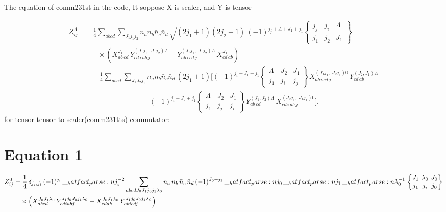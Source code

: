 \documentclass{scrartcl}
\newcommand{\sixj}[6]{\begingroup\setlength{\arraycolsep}{0.2em}\begin{Bmatrix} #1 & #2 & #3 \\ #4 & #5 & #6 \end{Bmatrix}\endgroup}
\begin{document}
The equation of comm231st in the code, It soppose X is scaler, and Y is tensor




\begin{align}
Z_{ij}^{\Lambda}
&= \frac{1}{4}\sum_{abcd}\sum_{J_1 j_1 j_2}
n_a n_b \bar n_c \bar n_d\,
\sqrt{(2j_1+1)(2j_2+1)}\,
(-1)^{j_j+\Lambda+J_1+j_1}
\begin{Bmatrix}
j_j & j_i & \Lambda\\
j_1 & j_2 & J_1
\end{Bmatrix}
\nonumber\\
&\qquad\times
\left(
X^{J_1}_{ab\,cd}\,
Y^{(J_1 j_1,\;J_1 j_2)\Lambda}_{cd\,i\,ab\,j}
-
Y^{(J_1 j_1,\;J_1 j_2)\Lambda}_{ab\,i\,cd\,j}\,
X^{J_1}_{cd\,ab}
\right)
\nonumber\\[1ex]
&\quad
+ \frac{1}{4}\sum_{abcd}\sum_{J_1 J_2 j_1}
n_a n_b \bar n_c \bar n_d\,(2j_1+1)
\Bigg[
(-1)^{j_i+J_1+j_1}
\begin{Bmatrix}
\Lambda & J_2 & J_1\\
j_1 & j_i & j_j
\end{Bmatrix}
X^{(J_1 j_1,\;J_2 j_1)0}_{ab\,i\,cd\,j}\,
Y^{(J_2,J_1)\Lambda}_{cd\,ab}
\nonumber\\
&\qquad\qquad\qquad\qquad
-
(-1)^{j_i+J_2+j_1}
\begin{Bmatrix}
\Lambda & J_2 & J_1\\
j_1 & j_j & j_i
\end{Bmatrix}
Y^{(J_1,J_2)\Lambda}_{ab\,cd}\,
X^{(J_2 j_1,\;J_1 j_1)0}_{cd\,i\,ab\,j}
\Bigg].
\label{sym:comm231st}
\end{align}
for tensor-tensor-to-scaler(comm231tts) commutator:

\section{Equation 1}
\begin{dmath*}
\begin{aligned}
Z_{i j}^{0}
&= \frac{1}{4}\,\delta_{{j}_{j},{j}_{i}} \, (-1)^{{j}_{i}} \, \hatfact{{j}_{i}^{-2}}
\sum_{a b c d {J}_{0} {J}_{1} {j}_{0} {j}_{1} {{\lambda}}_{0}}
n_{a} \, n_{b} \, \bar{n}_{c} \, \bar{n}_{d}
\, (-1)^{{J}_{0}+{j}_{1}} \, \hatfact{{j}_{0}} \, \hatfact{{j}_{1}} \, \hatfact{{{\lambda}}_{0}^{-1}}
\, \sixj{{J}_{1}}{{{\lambda}}_{0}}{{J}_{0}}{{j}_{1}}{{j}_{i}}{{j}_{0}}
\\
&\quad\times
\Big(
X_{a b c d}^{{J}_{0} {J}_{1} {{\lambda}}_{0}} \, Y_{c d i a b j}^{{J}_{1} {j}_{0} {J}_{0} {j}_{1} {{\lambda}}_{0}}
-
X_{c d a b}^{{J}_{0} {J}_{1} {{\lambda}}_{0}} \, Y_{a b i c d j}^{{J}_{1} {j}_{0} {J}_{0} {j}_{1} {{\lambda}}_{0}}
\Big)
\end{aligned}
\end{dmath*}
\end{document}
